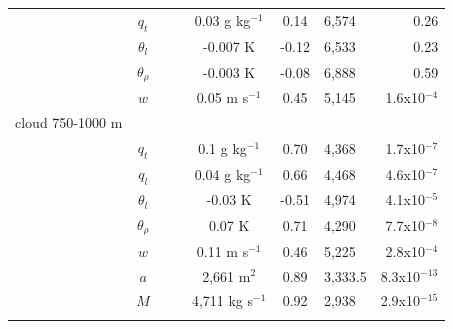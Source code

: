 \documentclass[acp]{copernicus}
\begin{document}
\begin{table}[t]
\begin{tabular}{lccccclr}
& $q_t$       & & &  0.03 g kg$^{-1}$          &  0.14 & 6,574 & 0.26    \\
& $\theta_l$ & & & -0.007 K                   & -0.12 & 6,533 & 0.23    \\
& $\theta_\rho$ & & & -0.003 K               & -0.08 & 6,888 & 0.59    \\
& $w$         & & &  0.05 m s$^{-1}$           &  0.45 & 5,145 & 1.6x10$^{-4}$ \\
cloud 750-1000 m & & & & & &          \\
& $q_t$       & & &  0.1 g kg$^{-1}$           &  0.70 & 4,368   & 1.7x10$^{-7}$ \\
& $q_l$       & & &  0.04 g kg$^{-1}$          &  0.66 & 4,468   & 4.6x10$^{-7}$ \\
& $\theta_l$ & & & -0.03 K                    & -0.51 & 4,974   & 4.1x10$^{-5}$  \\
& $\theta_\rho$ & & &  0.07 K                &  0.71 & 4,290   & 7.7x10$^{-8}$ \\
& $w$         & & &  0.11 m s$^{-1}$           &  0.46 & 5,225   & 2.8x10$^{-4}$  \\
& $a$         & & &  2,661 m$^2$                &  0.89 & 3,333.5 & 8.3x10$^{-13}$ \\
& $M$         & & &  4,711 kg s$^{-1}$    &  0.92 & 2,938 & 2.9x10$^{-15}$ \\

\bottomhline
\end{tabular}
\end{table}





\end{document}
